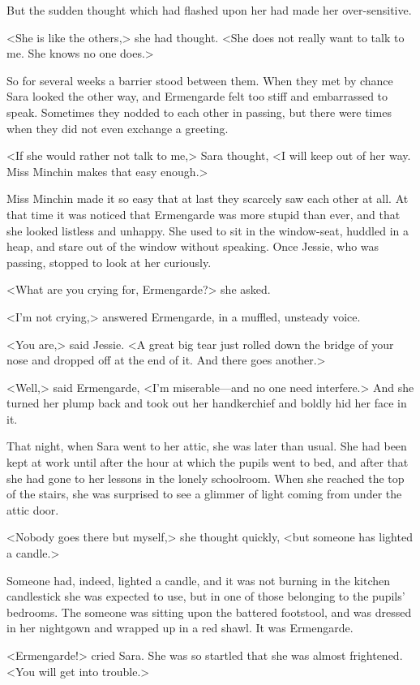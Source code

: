 But the sudden thought which had flashed upon her had made her over-sensitive.

<She is like the others,> she had thought. <She does not really want to talk to me. She knows no one does.>

So for several weeks a barrier stood between them. When they met by chance Sara looked the other way, and Ermengarde felt too stiff and embarrassed to speak. Sometimes they nodded to each other in passing, but there were times when they did not even exchange a greeting.

<If she would rather not talk to me,> Sara thought, <I will keep out of her way. Miss Minchin makes that easy enough.>

Miss Minchin made it so easy that at last they scarcely saw each other at all. At that time it was noticed that Ermengarde was more stupid than ever, and that she looked listless and unhappy. She used to sit in the window-seat, huddled in a heap, and stare out of the window without speaking. Once Jessie, who was passing, stopped to look at her curiously.

<What are you crying for, Ermengarde?> she asked.

<I'm not crying,> answered Ermengarde, in a muffled, unsteady voice.

<You are,> said Jessie. <A great big tear just rolled down the bridge of your nose and dropped off at the end of it. And there goes another.>

<Well,> said Ermengarde, <I'm miserable—and no one need interfere.> And she turned her plump back and took out her handkerchief and boldly hid her face in it.

That night, when Sara went to her attic, she was later than usual. She had been kept at work until after the hour at which the pupils went to bed, and after that she had gone to her lessons in the lonely schoolroom. When she reached the top of the stairs, she was surprised to see a glimmer of light coming from under the attic door.

<Nobody goes there but myself,> she thought quickly, <but someone has lighted a candle.>

Someone had, indeed, lighted a candle, and it was not burning in the kitchen candlestick she was expected to use, but in one of those belonging to the pupils' bedrooms. The someone was sitting upon the battered footstool, and was dressed in her nightgown and wrapped up in a red shawl. It was Ermengarde.

<Ermengarde!> cried Sara. She was so startled that she was almost frightened. <You will get into trouble.>

